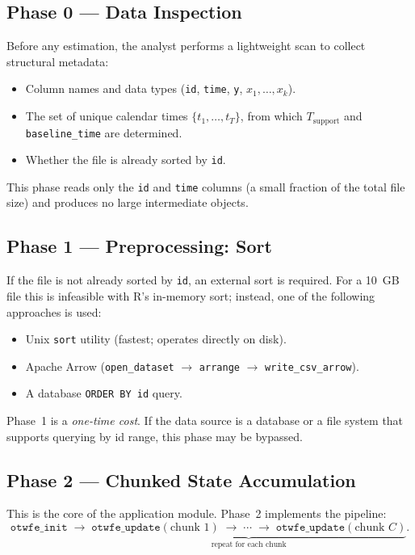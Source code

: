 \documentclass[11pt, a4paper]{article}
\begin{document}
\subsection{Phase 0 --- Data Inspection}

Before any estimation, the analyst performs a lightweight scan to collect
structural metadata:
\begin{itemize}
  \item Column names and data types (\texttt{id}, \texttt{time}, \texttt{y},
        $x_1,\ldots,x_k$).
  \item The set of unique calendar times $\{t_1,\ldots,t_T\}$, from which
        $T_{\mathrm{support}}$ and \texttt{baseline\_time} are determined.
  \item Whether the file is already sorted by \texttt{id}.
\end{itemize}

This phase reads only the \texttt{id} and \texttt{time} columns (a small
fraction of the total file size) and produces no large intermediate objects.

\subsection{Phase 1 --- Preprocessing: Sort}

If the file is not already sorted by \texttt{id}, an external sort is required.
For a 10~GB file this is infeasible with R's in-memory sort; instead, one of
the following approaches is used:
\begin{itemize}
  \item Unix \texttt{sort} utility (fastest; operates directly on disk).
  \item Apache Arrow (\texttt{open\_dataset} $\to$ \texttt{arrange} $\to$
        \texttt{write\_csv\_arrow}).
  \item A database \texttt{ORDER BY id} query.
\end{itemize}
Phase~1 is a \emph{one-time cost}.  If the data source is a database or a
file system that supports querying by id range, this phase may be bypassed.

\subsection{Phase 2 --- Chunked State Accumulation}

This is the core of the application module.  Phase~2 implements the pipeline:
\[
  \texttt{otwfe\_init} \;\to\;
  \underbrace{\texttt{otwfe\_update}(\text{chunk 1})
    \;\to\; \cdots \;\to\;
    \texttt{otwfe\_update}(\text{chunk } C)}_{\text{repeat for each chunk}}.
\]
\end{document}
